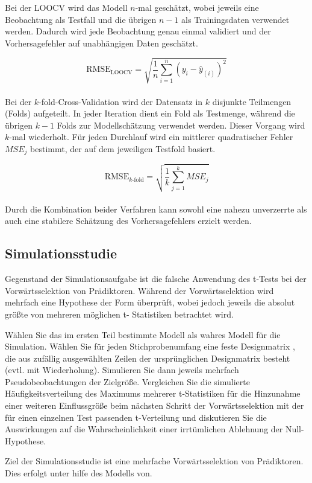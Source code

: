 Bei der LOOCV wird das Modell \(n\)-mal geschätzt, wobei jeweils eine Beobachtung als Testfall und die übrigen \(n-1\) als Trainingsdaten verwendet werden. Dadurch wird jede Beobachtung genau einmal validiert und der Vorhersagefehler auf unabhängigen Daten geschätzt.

\[\mathrm{RMSE}_{\mathrm{LOOCV}} = \sqrt{\frac{1}{n} \sum_{i=1}^n (y_i - \hat{y}_{(i)})^2}\] \\

Bei der \( k \)-fold-Cross-Validation wird der Datensatz in \( k \) disjunkte Teilmengen (Folds) aufgeteilt. In jeder Iteration dient ein Fold als Testmenge, während die übrigen \( k-1 \) Folds zur Modellschätzung verwendet werden. Dieser Vorgang wird \( k \)-mal wiederholt. Für jeden Durchlauf wird ein mittlerer quadratischer Fehler \(MSE_j\) bestimmt, der auf dem jeweiligen Testfold basiert.

\[\mathrm{RMSE}_{k\text{-fold}} = \sqrt{\frac{1}{k} \sum_{j=1}^{k} MSE_j}\]\\

Durch die Kombination beider Verfahren kann sowohl eine nahezu unverzerrte als auch eine stabilere Schätzung des Vorhersagefehlers erzielt werden.

\subsection{Simulationsstudie}
Gegenstand der Simulationsaufgabe ist die falsche Anwendung des t-Tests bei der
Vorwärtsselektion von Prädiktoren. Während der Vorwärtsselektion wird mehrfach
eine Hypothese der Form
überprüft, wobei jedoch jeweils die absolut größte von mehreren möglichen t-
Statistiken betrachtet wird.

Wählen Sie das im ersten Teil bestimmte Modell als wahres Modell für die
Simulation. Wählen Sie für jeden Stichprobenumfang eine feste Designmatrix , die aus
zufällig ausgewählten Zeilen der ursprünglichen Designmatrix besteht (evtl. mit
Wiederholung). Simulieren Sie dann jeweils mehrfach Pseudobeobachtungen der
Zielgröße. Vergleichen Sie die simulierte Häufigkeitsverteilung des Maximums
mehrerer t-Statistiken für die Hinzunahme einer weiteren Einflussgröße beim nächsten
Schritt der Vorwärtsselektion mit der für einen einzelnen Test passenden t-Verteilung
und diskutieren Sie die Auswirkungen auf die Wahrscheinlichkeit einer irrtümlichen
Ablehnung der Null-Hypothese.



Ziel der Simulationsstudie ist eine mehrfache Vorwärtsselektion von Prädiktoren. Dies erfolgt unter hilfe des Modells von. 

